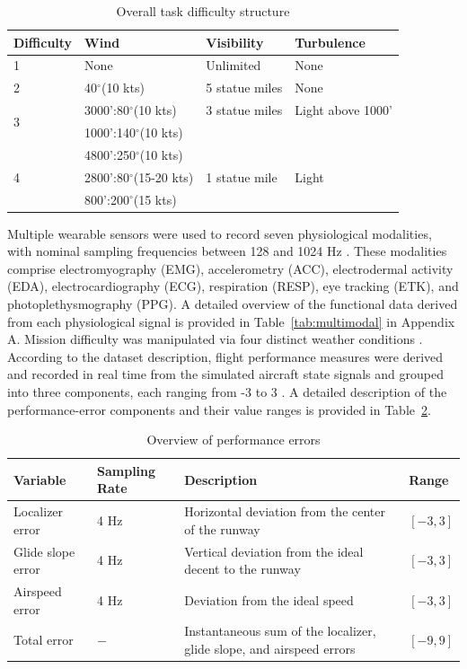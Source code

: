 \documentclass[11pt, a4paper]{article}
\begin{document}
\begin{table}[htbp]
	\caption{Overall task difficulty structure}
	\label{tab:task_level}
	\centering
	\small
	\begin{tabular}{llll}
		\toprule                                 	
		Difficulty      &Wind         &Visibility    &Turbulence \\ 
		\midrule
		1					&None			&Unlimited		&None \\
		\midrule
		2					&40\(^{\circ}\)(10 kts)  & 5 statue miles	&None \\
		\midrule
		\multirow{2}{*}{3}	&3000':80\(^{\circ}\)(10 kts)  & 3 statue miles & Light above 1000'\\
							&1000':140\(^{\circ}\)(10 kts) & 				& \\
		\midrule
		\multirow{3}{*}{4}	&4800':250\(^{\circ}\)(10 kts) &   &  \\
							&2800':80\(^{\circ}\)(15-20 kts) & 1 statue mile	& Light \\
							&800':200\(^{\circ}\)(15 kts)	&				& \\
		\bottomrule
	\end{tabular}
\end{table}

Multiple wearable sensors were used to record seven physiological modalities, with nominal sampling frequencies between 128 and 1024 Hz \cite{rao-2022}. These modalities comprise electromyography (EMG), accelerometry (ACC), electrodermal activity (EDA), electrocardiography (ECG), respiration (RESP), eye tracking (ETK), and photoplethysmography (PPG). A detailed overview of the functional data derived from each physiological signal is provided in Table~\ref{tab:multimodal} in Appendix A. Mission difficulty was manipulated via four distinct weather conditions \cite{rao-2022}. According to the dataset description, flight performance measures were derived and recorded in real time from the simulated aircraft state signals and grouped into three components, each ranging from -3 to 3 \cite{rao-2022}. A detailed description of the performance-error components and their value ranges is provided in Table~\ref{tab:error}.

\begin{table}[htbp]
	\caption{Overview of performance errors}
	\label{tab:error}
	\centering
	\small
	\begin{tabular}{llp{3cm}l}
		\toprule                                 	
		Variable      &Sampling Rate         &Description    &Range \\ 
		\midrule
		Localizer error		& 4 Hz	& Horizontal deviation from the center of the runway  & $[-3, 3]$ \\
		\midrule
		Glide slope error	& 4 Hz	& Vertical deviation from the ideal decent to the runway  & $[-3, 3]$ \\
		\midrule
		Airspeed error	& 4 Hz	& Deviation from the ideal speed  & $[-3, 3]$ \\
		\midrule
		Total error		& $-$		& Instantaneous sum of the localizer, glide slope, and airspeed errors  & $[-9, 9]$ \\
		\bottomrule
	\end{tabular}
\end{table}
\end{document}
